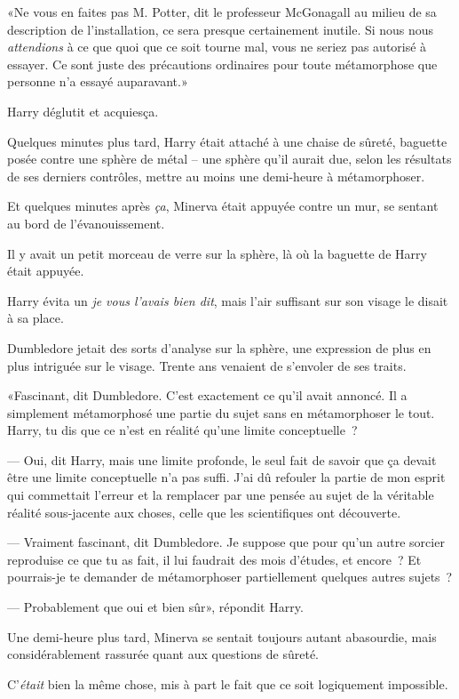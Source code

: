 «Ne vous en faites pas M. Potter, dit le professeur McGonagall au milieu de sa description de l'installation, ce sera presque certainement inutile. Si nous nous \emph{attendions} à ce que quoi que ce soit tourne mal, vous ne seriez pas autorisé à essayer. Ce sont juste des précautions ordinaires pour toute métamorphose que personne n'a essayé auparavant.»

Harry déglutit et acquiesça.

Quelques minutes plus tard, Harry était attaché à une chaise de sûreté, baguette posée contre une sphère de métal -- une sphère qu'il aurait due, selon les résultats de ses derniers contrôles, mettre au moins une demi-heure à métamorphoser.

Et quelques minutes après \emph{ça}, Minerva était appuyée contre un mur, se sentant au bord de l'évanouissement.

Il y avait un petit morceau de verre sur la sphère, là où la baguette de Harry était appuyée.

Harry évita un \emph{je vous l'avais bien dit}, mais l'air suffisant sur son visage le disait à sa place.

Dumbledore jetait des sorts d'analyse sur la sphère, une expression de plus en plus intriguée sur le visage. Trente ans venaient de s'envoler de ses traits.

«Fascinant, dit Dumbledore. C'est exactement ce qu'il avait annoncé. Il a simplement métamorphosé une partie du sujet sans en métamorphoser le tout. Harry, tu dis que ce n'est en réalité qu'une limite conceptuelle~?

--- Oui, dit Harry, mais une limite profonde, le seul fait de savoir que ça devait être une limite conceptuelle n'a pas suffi. J'ai dû refouler la partie de mon esprit qui commettait l'erreur et la remplacer par une pensée au sujet de la véritable réalité sous-jacente aux choses, celle que les scientifiques ont découverte.

--- Vraiment fascinant, dit Dumbledore. Je suppose que pour qu'un autre sorcier reproduise ce que tu as fait, il lui faudrait des mois d'études, et encore~? Et pourrais-je te demander de métamorphoser partiellement quelques autres sujets~?

--- Probablement que oui et bien sûr», répondit Harry.

Une demi-heure plus tard, Minerva se sentait toujours autant abasourdie, mais considérablement rassurée quant aux questions de sûreté.

C'\emph{était} bien la même chose, mis à part le fait que ce soit logiquement impossible.

